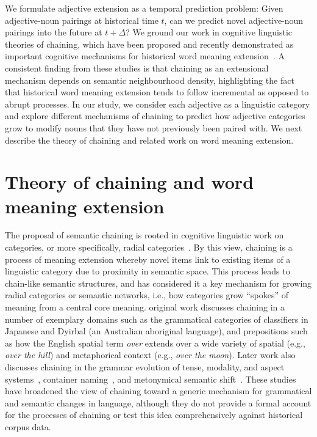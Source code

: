 \documentclass[output=paper]{langsci/langscibook}
\begin{document}
We formulate adjective extension as a temporal prediction problem: Given adjective-noun pairings at historical time $t$, can we predict novel adjective-noun pairings into the future at $t + \Delta$? We ground our  work in cognitive linguistic theories of chaining, which have been proposed and recently demonstrated as important cognitive mechanisms for historical word meaning extension~\citep{lakoff1987,malt1999,bybee1994evolution,sloman,xu2016,ramiro2018,habibi}. A consistent finding from these studies is that chaining as an extensional mechanism depends on semantic neighbourhood density, highlighting the fact that historical word meaning extension tends to follow incremental as opposed to abrupt processes. In our study, we consider each adjective as a linguistic category and explore different mechanisms of chaining to predict how adjective categories grow to modify nouns that they have not previously been paired with. We next describe the theory of chaining and related  work on word meaning extension.


\section{Theory of chaining and word meaning extension}

The proposal of semantic chaining is rooted in cognitive linguistic work on categories, or more specifically, radial categories~\citep{lakoff1987}. By this view, chaining is a process of meaning extension whereby novel items link to existing items of a linguistic category due to proximity in semantic space. This process leads to chain-like semantic structures, and \citet{lakoff1987} has considered it a key mechanism for growing radial categories or semantic networks, i.e., how categories grow ``spokes'' of meaning from a central core meaning.  original work discusses chaining in a number of exemplary domains such as the grammatical categories of classifiers in Japanese and Dyirbal (an Australian aboriginal language), and  prepositions such as how the English spatial term \textit{over} extends over a wide variety of spatial (e.g., \textit{over the hill}) and metaphorical context (e.g., \textit{over the moon}). Later work also discusses chaining in the grammar evolution of tense, modality, and aspect systems~\citep{bybee1994evolution}, container naming~\citep{malt1999}, and metonymical semantic shift~\citep{hilpert2007chained}. These studies have broadened the view of chaining toward a generic mechanism for grammatical and semantic changes in language, although they do not provide a formal account for the processes of chaining or test this idea comprehensively against historical corpus data.
\end{document}
